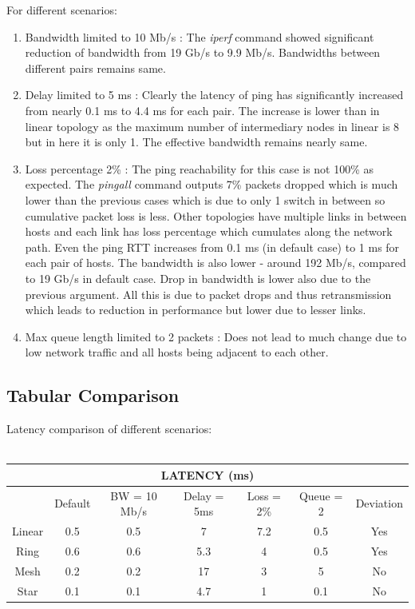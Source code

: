 \documentclass[a4paper, 11pt]{article}
\begin{document}
For different scenarios:
\begin{enumerate}
\item Bandwidth limited to 10 Mb/s : The \textit{iperf} command showed significant reduction of bandwidth from 19 Gb/s to 9.9 Mb/s. Bandwidths between different pairs remains same.
\item Delay limited to 5 ms : Clearly the latency of ping has significantly increased from nearly 0.1 ms to 4.4 ms for each pair. The increase is lower than in linear topology as the maximum number of intermediary nodes in linear is 8 but in here it is only 1. The effective bandwidth remains nearly same.
\item Loss percentage 2\% : The ping reachability for this case is not 100\% as expected. The \textit{pingall} command outputs 7\% packets dropped which is much lower than the previous cases which is due to only 1 switch in between so cumulative packet loss is less. Other topologies have multiple links in between hosts and each link has loss percentage which cumulates along the network path. Even the ping RTT increases from 0.1 ms (in default case) to 1 ms for each pair of hosts. The bandwidth is also lower - around 192 Mb/s, compared to 19 Gb/s in default case. Drop in bandwidth is lower also due to the previous argument. All this is due to packet drops and thus retransmission which leads to reduction in performance but lower due to lesser links.
\item Max queue length limited to 2 packets : Does not lead to much change due to low network traffic and all hosts being adjacent to each other.
\end{enumerate}


\newpage

\subsection{Tabular Comparison}

Latency comparison of different scenarios:\\ \\

\begin{tabular}{|c|c|c|c|c|c|c|}
\hline 
\multicolumn{7}{|c|}{LATENCY (ms)}\tabularnewline
\hline 
\hline 
 & Default & BW = 10 Mb/s & Delay = 5ms & Loss = 2\% & Queue = 2 & Deviation\tabularnewline
\hline 
Linear & 0.5 & 0.5 & 7 & 7.2 & 0.5 & Yes\tabularnewline
\hline 
Ring & 0.6 & 0.6 & 5.3 & 4 & 0.5 & Yes\tabularnewline
\hline 
Mesh & 0.2 & 0.2 & 17 & 3 & 5 & No\tabularnewline
\hline 
Star & 0.1 & 0.1 & 4.7 & 1 & 0.1 & No\tabularnewline
\hline 
\end{tabular}\\ \\
\end{document}

